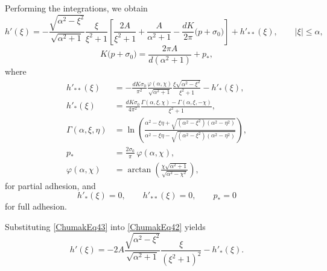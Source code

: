 Performing the integrations, we obtain
\begin{equation}
	\label{ChumakEq42}
	h'(\xi)
	=
	-\frac{\sqrt{\alpha^{2}-\xi^{2}}}{\sqrt{\alpha^{2}+1}}
	\frac{\xi}{\xi^{2}+1}
	\left[
	\frac{2A}{\xi^{2}+1}
	+
	\frac{A}{\alpha^{2}+1}
	-
	\frac{dK}{2\pi}\bigl(p+\sigma_{0}\bigr)
	\right]
	+h'_{**}(\xi),
	\qquad |\xi|\le\alpha ,
\end{equation}
\begin{equation}
	\label{ChumakEq43}
	K\bigl(p+\sigma_{0}\bigr)
	=
	\frac{2\pi A}{d(\alpha^{2}+1)}
	+p_{*},
\end{equation}
where
\begin{align}
	\label{ChumakEq44}
	h'_{**}(\xi)
	&=
	-\frac{dK\sigma_{0}}{\pi^{2}}
	\frac{\varphi(\alpha,\chi)}{\sqrt{\alpha^{2}+1}}
	\frac{\xi\sqrt{\alpha^{2}-\xi^{2}}}{\xi^{2}+1}
	-h'_{*}(\xi),
\\
	\label{ChumakEq45}
	h'_{*}(\xi)
	&=
	\frac{dK\sigma_{0}}{4\pi^{2}}
	\frac{\Gamma(\alpha,\xi,\chi)-\Gamma(\alpha,\xi,-\chi)}{\xi^{2}+1},
\\
	\label{ChumakEq46}
	\Gamma(\alpha,\xi,\eta)
	&=
	\ln\!\left(
	\frac{
		\alpha^{2}-\xi\eta+\sqrt{(\alpha^{2}-\xi^{2})(\alpha^{2}-\eta^{2})}
	}{
		\alpha^{2}-\xi\eta-\sqrt{(\alpha^{2}-\xi^{2})(\alpha^{2}-\eta^{2})}
	}
	\right),
\\
	\label{ChumakEq47}
	p_{*}
	&=
	\frac{2\sigma_{0}}{\pi}\,\varphi(\alpha,\chi),
\\
	\label{ChumakEq48}
	\varphi(\alpha,\chi)
	&=
	\arctan\!\left(
	\frac{\chi\sqrt{\alpha^{2}+1}}{\sqrt{\alpha^{2}-\chi^{2}}}
	\right),
\end{align}
for partial adhesion, and
\begin{equation}
	\label{ChumakEq49}
	h'_{*}(\xi)=0,
	\qquad
	h'_{**}(\xi)=0,
	\qquad
	p_{*}=0
\end{equation}
for full adhesion.

Substituting \eqref{ChumakEq43} into \eqref{ChumakEq42} yields
\begin{equation}
	\label{ChumakEq50}
	h'(\xi)
	=
	-2A
	\frac{\sqrt{\alpha^{2}-\xi^{2}}}{\sqrt{\alpha^{2}+1}}
	\frac{\xi}{(\xi^{2}+1)^{2}}
	-
	h'_{*}(\xi).
\end{equation}

